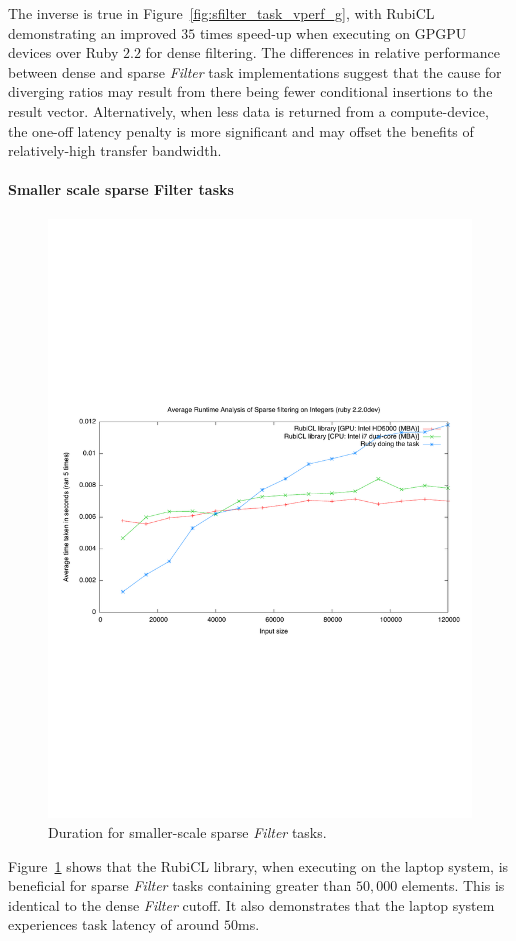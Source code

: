 The inverse is true in Figure~\ref{fig:sfilter_task_vperf_g}, with RubiCL demonstrating an improved $3$\textendash$5$ times speed-up when executing on \ac{GPGPU} devices over Ruby $2.2$ for dense filtering.
The differences in relative performance between dense and sparse \emph{Filter} task implementations suggest that the cause for diverging ratios may result from there being fewer conditional insertions to the result vector. Alternatively, when less data is returned from a compute-device, the one-off latency penalty is more significant and may offset the benefits of relatively-high transfer bandwidth.

\paragraph*{Smaller scale sparse Filter tasks}
\begin{figure}[H]
  \includegraphics[trim=0cm 8cm 0cm 8cm, clip=true, width=\textwidth]{./graphing/smallsparsefilter.pdf}
  \caption{Duration for smaller-scale sparse \emph{Filter} tasks.}
  \label{fig:sparsefil_tasksmallrun}
\end{figure}
Figure~\ref{fig:sparsefil_tasksmallrun} shows that the RubiCL library, when executing on the laptop system, is beneficial for sparse \emph{Filter} tasks containing greater than $50,000$ elements. This is identical to the dense \emph{Filter} cutoff. It also demonstrates that the laptop system experiences task latency of around $50$ms.

